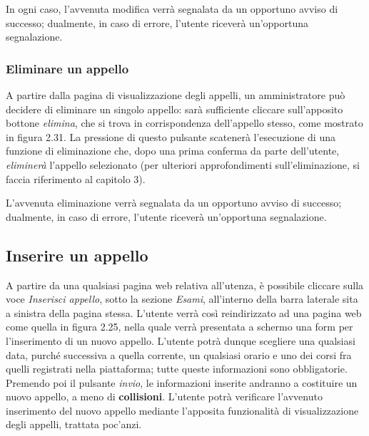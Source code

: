 \documentclass [a4paper,11pt]{book}
\begin{document}
In ogni caso, l'avvenuta modifica verrà segnalata da un opportuno avviso di successo; dualmente, in caso di errore, l'utente riceverà un'opportuna segnalazione.

\medskip

\subsubsection{Eliminare un appello}

A partire dalla pagina di visualizzazione degli appelli, un amministratore può decidere di eliminare un singolo appello: sarà sufficiente cliccare sull'apposito bottone \emph{elimina}, che si trova in corrispondenza dell'appello stesso, come mostrato in figura 2.31. La pressione di questo pulsante scatenerà l'esecuzione di una funzione di eliminazione che, dopo una prima conferma da parte dell'utente, \emph{eliminerà} l'appello selezionato (per ulteriori approfondimenti sull'eliminazione, si faccia riferimento al capitolo 3).

L'avvenuta eliminazione verrà segnalata da un opportuno avviso di successo; dualmente, in caso di errore, l'utente riceverà un'opportuna segnalazione.

\medskip

\subsection{Inserire un appello}

A partire da una qualsiasi pagina web relativa all'utenza, è possibile cliccare sulla voce \emph{Inserisci appello}, sotto la sezione \emph{Esami}, all'interno della barra laterale sita a sinistra della pagina stessa. L'utente verrà così reindirizzato ad una pagina web come quella in figura 2.25, nella quale verrà presentata a schermo una form per l'inserimento di un nuovo appello. L'utente potrà dunque scegliere una qualsiasi data, purché successiva a quella corrente, un qualsiasi orario e uno dei corsi fra quelli registrati nella piattaforma; tutte queste informazioni sono obbligatorie. Premendo poi il pulsante \emph{invio}, le informazioni inserite andranno a costituire un nuovo appello, a meno di \textbf{collisioni}. L'utente potrà verificare l'avvenuto inserimento del nuovo appello mediante l'apposita funzionalità di visualizzazione degli appelli, trattata poc'anzi.
\end{document}
